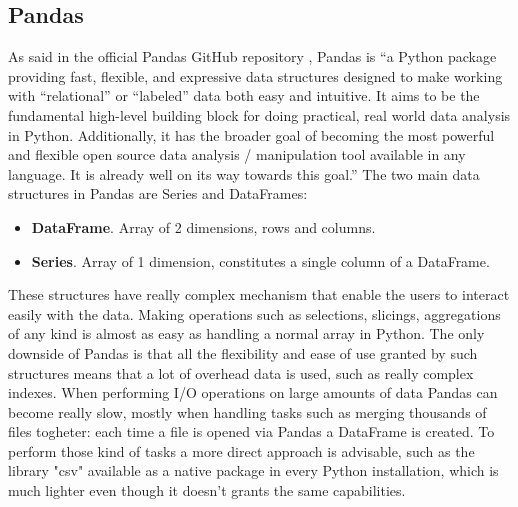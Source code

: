\documentclass[11pt,a4paper,titlepage]{book}
\begin{document}
\subsection{Pandas}
\begin{figure}
    \centering
    
\end{figure}
As said in the official Pandas GitHub repository \cite{pandas}, Pandas is “a Python package providing fast, flexible, and expressive data structures designed to make working with “relational” or “labeled” data both easy and intuitive. It aims to be the fundamental high-level building block for doing practical, real world data analysis in Python. Additionally, it has the broader goal of becoming the most powerful and flexible open source data analysis / manipulation tool available in any language. It is already well on its way towards this goal.”
\newline
\newline
The two main data structures in Pandas are Series and DataFrames:
\begin{itemize}
    \item \textbf{DataFrame}. Array of 2 dimensions, rows and columns.
    \item \textbf{Series}. Array of 1 dimension, constitutes a single column of a DataFrame.
\end{itemize}
These structures have really complex mechanism that enable the users to interact easily with the data. Making operations such as selections, slicings, aggregations of any kind is almost as easy as handling a normal array in Python.
\newline
\newline
The only downside of Pandas is that all the flexibility and ease of use granted by such structures means that a lot of overhead data is used, such as really complex indexes. When performing I/O operations on large amounts of data Pandas can become really slow, mostly when handling tasks such as merging thousands of files togheter: each time a file is opened via Pandas a DataFrame is created.
To perform those kind of tasks a more direct approach is advisable, such as the library "csv" available as a native package in every Python installation, which is much lighter even though it doesn't grants the same capabilities.
\end{document}
